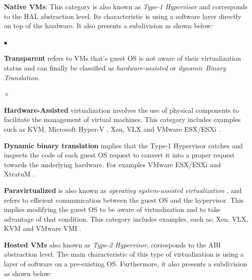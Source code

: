 	\textbf{Native VMs}: This category is also known as \textit{Type-1 Hypervisor} and corresponds to the HAL abstraction level. Its characteristic is using a software layer directly on top of the hardware. It also presents a subdivision as shown below:
		
	\begin{list}{$\bullet$}{\setlength{\leftmargin}{5pt}}

			\item \textbf {Transparent} refers to VMs that's guest OS is not aware of their virtualization status and can finally be classified as \textit{hardware-assisted} or \textit{dynamic Binary Translation}.
			
			\begin{list}{$\diamond$}{\setlength{\leftmargin}{8pt}}

				\item \textbf{Hardware-Assisted} virtualization involves the use of physical components to facilitate the management of virtual machines. This category includes examples such as KVM, Microsoft Hyper-V \cite{Kappel2009}, Xen, VLX and VMware ESX/ESXi \cite{VMware2018Website}.
				
				\item \textbf{Dynamic binary translation} implies that the Type-1 Hypervisor catches and inspects the code of each guest OS request to convert it into a proper request towards the underlying hardware. For examples VMware ESX/ESXi and XtratuM \cite{XtratuM}.
				 
			\end{list}
			
			\item \textbf{Paravirtualized} is also known as \textit{operating system-assisted virtualization} \cite{VMware2008}, \cite{VMware2018Website} and refers to efficient communication between the guest OS and the hypervisor. This implies modifying the guest OS to be aware of virtualization and to take advantage of that condition. This category includes examples, such as; Xen, VLX, KVM and VMware VMI \cite{VMware2018Website}.
			
		\end{list}	
		
	\textbf{Hosted VMs} also known as \textit{Type-2 Hypervisor}, corresponds to the ABI abstraction level. The main characteristic of this type of virtualization is using a layer of software on a pre-existing OS. Furthermore, it also presents a subdivision as shown below:
		
